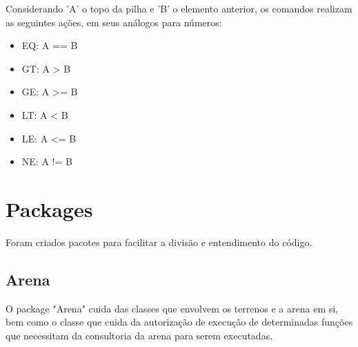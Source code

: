 \documentclass[a4paper]{article}
\begin{document}
        Considerando 'A' o topo da pilha e 'B' o elemento anterior,
        os comandos realizam as seguintes ações, em seus análogos 
        para números:
        \begin{itemize}
            \item EQ: A == B
            \item GT: A >  B
            \item GE: A >= B
            \item LT: A <  B
            \item LE: A <= B
            \item NE: A != B
        \end{itemize}
    









\newpage
\newpage

\section{Packages}
	Foram criados pacotes para facilitar a divisão
	e entendimento do código.
	
	\subsection{Arena}
		O package "Arena" cuida das classes que envolvem os
		terrenos e a arena em si, bem como o classe que cuida
		da autorização de execução de determinadas funções que
		necessitam da consultoria da arena para serem executadas.
		
\end{document}
